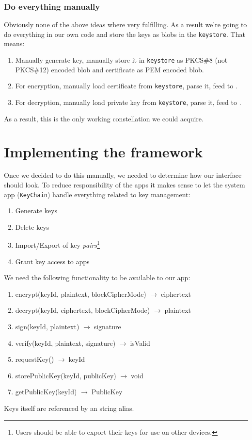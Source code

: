 \documentclass[a4paper,draft]{scrartcl}
\newcommand{\totype}{\(\to\;\)}
\begin{document}
		\subsubsection{Do everything manually}
			Obviously none of the above ideas where very fulfilling. As a result we're going to do everything in our own code and store the keys as blobs in the \texttt{keystore}. That means:
			\begin{enumerate}
				\item Manually generate key, manually store it in \texttt{keystore} as PKCS\#8 (not PKCS\#12) encoded blob and certificate as PEM encoded blob.
				\item For encryption, manually load certificate from \texttt{keystore}, parse it, feed to .
				\item For decryption, manually load private key from \texttt{keystore}, parse it, feed to .
			\end{enumerate}
			As a result, this is the only working constellation we could acquire.

\section{Implementing the framework}
	Once we decided to do this manually, we needed to determine how our interface should look. To reduce responsibility of the apps it makes sense to let the system app (\texttt{KeyChain}) handle everything related to key management:
	\begin{enumerate}
		\item Generate keys
		\item Delete keys
		\item Import/Export of key \emph{pairs}\footnote{Users should be able to export their keys for use on other devices.}
		\item Grant key access to apps
	\end{enumerate}
	We need the following functionality to be available to our app:
	\begin{enumerate}
	\tt
		\item encrypt(keyId, plaintext, blockCipherMode) \totype ciphertext
		\item decrypt(keyId, ciphertext, blockCipherMode) \totype plaintext
		\item sign(keyId, plaintext) \totype signature
		\item verify(keyId, plaintext, signature) \totype isValid
		\item requestKey() \totype keyId
		\item storePublicKey(keyId, publicKey) \totype void
		\item getPublicKey(keyId) \totype PublicKey
	\end{enumerate}
	Keys itself are referenced by an string alias.
\end{document}
